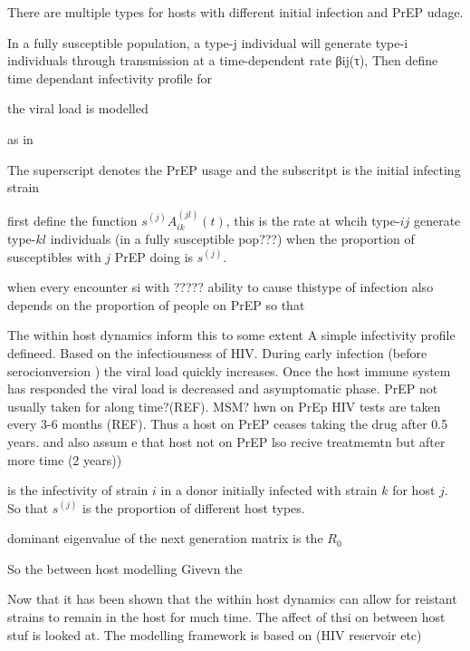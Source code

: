 \documentclass[DIV=15]{scrartcl}
\begin{document}
There are multiple types  for hosts with different initial  infection and PrEP udage.

In a fully susceptible population, a type-j
individual will generate type-i individuals through transmission
at a time-dependent rate βij(τ),
 Then define time dependant infectivity profile for 


the viral load is modelled 

as in 

The superscript denotes the PrEP  usage and the subscritpt  is the initial infecting strain

first define the function $s^{(j)}A^{(jl)}_{ik}(t)$, this is the rate at whcih type-$ij$ generate  type-$kl$ individuals (in a fully susceptible pop???) when the proportion  of susceptibles with $j$ PrEP doing is $s^{(j)}$.

when every encounter si with ????? ability to cause thistype of infection also depends on the proportion of people on PrEP so that 

The within host dynamics inform this to  some extent 
A simple infectivity profile defineed. Based on the infectiousness of  HIV. During early infection (before serocionversion  ) the viral load quickly  increases. Once the host immune system has responded the viral load is decreased and asymptomatic phase. PrEP not usually taken for   along time?(REF). MSM? hwn on PrEp HIV tests are taken every 3-6 months  (REF). Thus a host on PrEP ceases taking the drug after 0.5 years. and also  assum e  that host not on PrEP lso recive treatmemtn but after more time (2 years))


 is the infectivity of strain $i$ in a donor initially infected with strain $k$ for host $j$.  So that $s^{(j)}$ is the proportion of different host types.







dominant eigenvalue of the next generation matrix is the $R_0$ \cite{diekmann2013}


So the between host modelling Givevn the


Now that it has been shown that the within host dynamics can allow  for reistant strains to remain in the  host for much time. The affect of thsi on between host stuf  is looked at. The modelling framework is based on (HIV reservoir etc)
\end{document}
